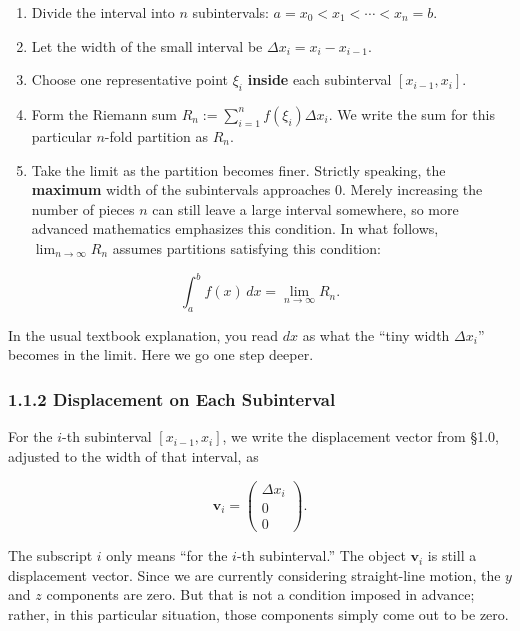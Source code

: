\documentclass[a4paper,12pt,openany]{book}
\providecommand{\tightlist}{%
  \setlength{\itemsep}{0pt}\setlength{\parskip}{0pt}}
\begin{document}
\begin{enumerate}
\def\labelenumi{\arabic{enumi}.}
\tightlist
\item
  Divide the interval into \(n\) subintervals:
  \(a=x_0<x_1<\cdots<x_n=b\).
\item
  Let the width of the small interval be \(\Delta x_i=x_i-x_{i-1}\).
\item
  Choose one representative point \(\xi_i\) \textbf{inside} each
  subinterval \([x_{i-1},x_i]\).
\item
  Form the Riemann sum \(R_n:=\sum_{i=1}^n f(\xi_i)\Delta x_i\). We
  write the sum for this particular \(n\)-fold partition as \(R_n\).
\item
  Take the limit as the partition becomes finer. Strictly speaking, the
  \textbf{maximum} width of the subintervals approaches \(0\). Merely
  increasing the number of pieces \(n\) can still leave a large interval
  somewhere, so more advanced mathematics emphasizes this condition. In
  what follows, \(\lim_{n\to\infty}R_n\) assumes partitions satisfying
  this condition:
\end{enumerate}

\[
\int_a^b f(x)\,dx = \lim_{n\to\infty} R_n.
\]

In the usual textbook explanation, you read \(dx\) as what the ``tiny
width \(\Delta x_i\)'' becomes in the limit. Here we go one step deeper.

\hypertarget{displacement-on-each-subinterval}{%
\subsubsection{1.1.2 Displacement on Each
Subinterval}\label{displacement-on-each-subinterval}}

For the \(i\)-th subinterval \([x_{i-1},x_i]\), we write the
displacement vector from §1.0, adjusted to the width of that interval,
as

\[
\mathbf{v}_i = \begin{pmatrix} \Delta x_i \\ 0 \\ 0 \end{pmatrix}.
\]

The subscript \(i\) only means ``for the \(i\)-th subinterval.'' The
object \(\mathbf{v}_i\) is still a displacement vector. Since we are
currently considering straight-line motion, the \(y\) and \(z\)
components are zero. But that is not a condition imposed in advance;
rather, in this particular situation, those components simply come out
to be zero.
\end{document}
